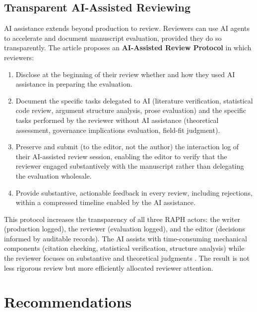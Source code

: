 \documentclass[12pt]{article}
\begin{document}
\subsection{Transparent AI-Assisted Reviewing}

AI assistance extends beyond production to review. Reviewers can use AI agents to accelerate
and document manuscript evaluation, provided they do so transparently.
The article proposes an \textbf{AI-Assisted Review Protocol} in which reviewers:

\begin{enumerate}\setlength{\itemsep}{3pt}
  \item Disclose at the beginning of their review whether and how they used AI assistance
    in preparing the evaluation.
  \item Document the specific tasks delegated to AI (literature verification, statistical
    code review, argument structure analysis, prose evaluation) and the specific tasks
    performed by the reviewer without AI assistance (theoretical assessment, governance
    implications evaluation, field-fit judgment).
  \item Preserve and submit (to the editor, not the author) the interaction log of their
    AI-assisted review session, enabling the editor to verify that the reviewer engaged
    substantively with the manuscript rather than delegating the evaluation wholesale.
  \item Provide substantive, actionable feedback in every review, including rejections,
    within a compressed timeline enabled by the AI assistance.
\end{enumerate}

This protocol increases the transparency of all three RAPH actors: the writer (production
logged), the reviewer (evaluation logged), and the editor (decisions informed by auditable
records). The AI assists with time-consuming mechanical components (citation checking,
statistical verification, structure analysis) while the reviewer focuses on substantive and
theoretical judgments . The result is not less rigorous review but more efficiently allocated
reviewer attention.

\section{Recommendations}
\end{document}
